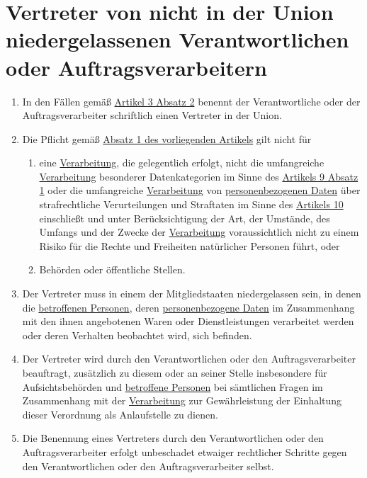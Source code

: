 \chapter{Vertreter von nicht in der Union niedergelassenen Verantwortlichen oder Auftragsverarbeitern}
\label{ch:27}


\begin{enumerate}

  \item In den Fällen gemäß \hyperref[itm:03-2]{Artikel 3 Absatz 2} benennt der Verantwortliche oder der
   Auftragsverarbeiter schriftlich einen Vertreter in der Union.
  \label{itm:27-1}

  \item Die Pflicht gemäß \hyperref[itm:27-1]{Absatz 1 des vorliegenden Artikels} gilt nicht für
  \label{itm:27-2}

  \begin{enumerate}
  
    \item eine \hyperref[itm:04-2]{Verarbeitung}, die gelegentlich erfolgt, nicht die umfangreiche \hyperref[itm:04-2]{Verarbeitung} besonderer Datenkategorien im
     Sinne des \hyperref[itm:09-1]{Artikels 9 Absatz 1} oder die umfangreiche \hyperref[itm:04-2]{Verarbeitung} von \hyperref[itm:04-1]{personenbezogenen Daten}
     über strafrechtliche Verurteilungen und Straftaten im Sinne des \hyperref[ch:10]{Artikels 10} einschließt und
     unter Berücksichtigung der Art, der Umstände, des Umfangs und der Zwecke der \hyperref[itm:04-2]{Verarbeitung} voraussichtlich nicht zu
     einem Risiko für die Rechte und Freiheiten natürlicher Personen führt, oder
    \label{itm:27-2a}

    \item Behörden oder öffentliche Stellen.
    \label{itm:27-2b}

  \end{enumerate}

  \item Der Vertreter muss in einem der Mitgliedstaaten niedergelassen sein, in denen die \hyperref[itm:04-1]{betroffenen Personen}, deren
   \hyperref[itm:04-1]{personenbezogene Daten} im Zusammenhang mit den ihnen angebotenen Waren oder Dienstleistungen verarbeitet werden oder
   deren Verhalten beobachtet wird, sich befinden.
  \label{itm:27-3}

  \item Der Vertreter wird durch den Verantwortlichen oder den Auftragsverarbeiter beauftragt, zusätzlich zu diesem oder
   an seiner Stelle insbesondere für Aufsichtsbehörden und \hyperref[itm:04-1]{betroffene Personen} bei sämtlichen Fragen im Zusammenhang
   mit der \hyperref[itm:04-2]{Verarbeitung} zur Gewährleistung der Einhaltung dieser Verordnung als Anlaufstelle zu dienen.
  \label{itm:27-4}

  \item Die Benennung eines Vertreters durch den Verantwortlichen oder den Auftragsverarbeiter erfolgt unbeschadet
   etwaiger rechtlicher Schritte gegen den Verantwortlichen oder den Auftragsverarbeiter selbst.
  \label{itm:27-5}

\end{enumerate}


